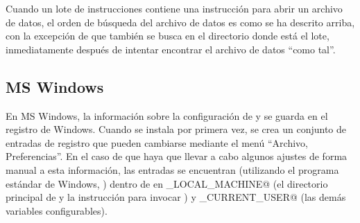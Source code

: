 Cuando un lote de instrucciones contiene una instrucción para abrir un
archivo de datos, el orden de búsqueda del archivo de datos es como se
ha descrito arriba, con la excepción de que también se busca en el
directorio donde está el lote, inmediatamente después de intentar
encontrar el archivo de datos ``como tal''.


\subsection{MS Windows}
\label{MS-behave}


En MS Windows, la información sobre la configuración de  y
 se guarda en el registro de Windows. Cuando 
se instala por primera vez, se crea un conjunto de entradas de
registro que pueden cambiarse mediante el menú ``Archivo,
Preferencias''. En el caso de que haya que llevar a cabo algunos
ajustes de forma manual a esta información, las entradas se encuentran
(utilizando el programa estándar de Windows, ) dentro
de \verb@Software\gretl@ en \verb@HKEY_LOCAL_MACHINE@ (el directorio
principal de  y la instrucción para invocar )
y \verb@HKEY_CURRENT_USER@ (las demás variables configurables).
      
